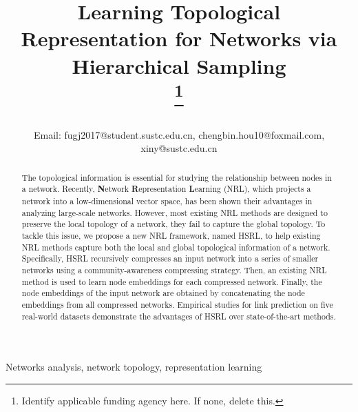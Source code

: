 \documentclass[conference]{IEEEtran}
\begin{document}
\title{Learning Topological Representation for Networks via Hierarchical Sampling \\
\thanks{Identify applicable funding agency here. If none, delete this.}
}

\author{ \\

	Email: fugj2017@student.sustc.edu.cn, chengbin.hou10@foxmail.com, xiny@sustc.edu.cn}
\maketitle

\begin{abstract}
The topological information is essential for studying the relationship between nodes in a network. Recently, \textbf{N}etwork \textbf{R}epresentation \textbf{L}earning (NRL), which projects a network into a low-dimensional vector space, has been shown their advantages in analyzing large-scale networks. However, most existing NRL methods are designed to preserve the local topology of a network, they fail to capture the global topology. To tackle this issue, we propose a new NRL framework, named HSRL, to help existing NRL methods capture both the local and global topological information of a network. Specifically, HSRL recursively compresses an input network into a series of smaller networks using a community-awareness compressing strategy. Then, an existing NRL method is used to learn node embeddings for each compressed network. Finally, the node embeddings of the input network are obtained by concatenating the node embeddings from all compressed networks. Empirical studies for link prediction on five real-world datasets demonstrate the advantages of HSRL over state-of-the-art methods.
\end{abstract}

\begin{IEEEkeywords}
Networks analysis, network topology, representation learning
\end{IEEEkeywords}
\end{document}
